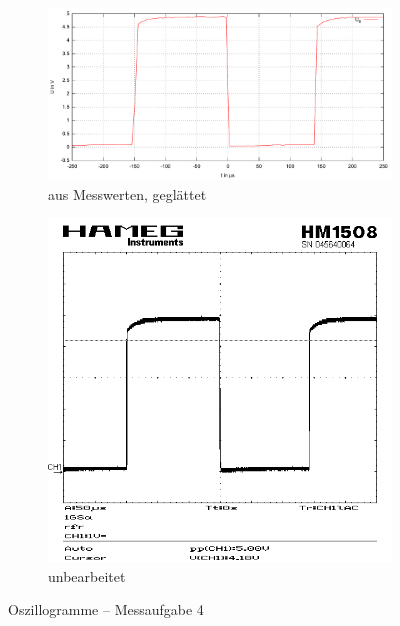 \documentclass[numbers=noenddot,10pt,a4paper]{scrartcl}
\begin{document}
\begin{figure}[H]
\centering
\begin{subfigure}[b]{0.66\textwidth}
\includegraphics[width=\textwidth]{oszillo2.pdf}
\caption{aus Messwerten, geglättet}
\end{subfigure}
\begin{subfigure}[b]{0.33\textwidth}
\includegraphics[width=\textwidth]{SCR00003.png}
\caption{unbearbeitet}
\end{subfigure}
\caption{Oszillogramme -- Messaufgabe 4}
\end{figure}
\end{document}
